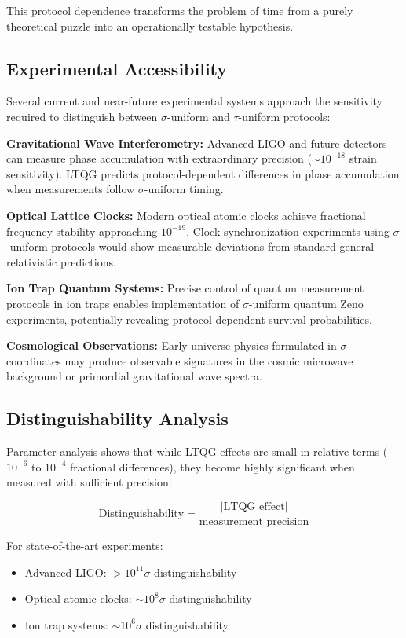 \documentclass[12pt,a4paper]{article}
\begin{document}
This protocol dependence transforms the problem of time from a purely theoretical puzzle into an operationally testable hypothesis.

\subsection{Experimental Accessibility}

Several current and near-future experimental systems approach the sensitivity required to distinguish between $\sigma$-uniform and $\tau$-uniform protocols:

\textbf{Gravitational Wave Interferometry:}
Advanced LIGO and future detectors can measure phase accumulation with extraordinary precision ($\sim 10^{-18}$ strain sensitivity). LTQG predicts protocol-dependent differences in phase accumulation when measurements follow $\sigma$-uniform timing.

\textbf{Optical Lattice Clocks:}
Modern optical atomic clocks achieve fractional frequency stability approaching $10^{-19}$. Clock synchronization experiments using $\sigma$-uniform protocols would show measurable deviations from standard general relativistic predictions.

\textbf{Ion Trap Quantum Systems:}
Precise control of quantum measurement protocols in ion traps enables implementation of $\sigma$-uniform quantum Zeno experiments, potentially revealing protocol-dependent survival probabilities.

\textbf{Cosmological Observations:}
Early universe physics formulated in $\sigma$-coordinates may produce observable signatures in the cosmic microwave background or primordial gravitational wave spectra.

\subsection{Distinguishability Analysis}

Parameter analysis shows that while LTQG effects are small in relative terms ($10^{-6}$ to $10^{-4}$ fractional differences), they become highly significant when measured with sufficient precision:

\begin{equation}
\text{Distinguishability} = \frac{|\text{LTQG effect}|}{\text{measurement precision}}
\end{equation}

For state-of-the-art experiments:
\begin{itemize}
\item Advanced LIGO: $>10^{11}\sigma$ distinguishability
\item Optical atomic clocks: $\sim 10^8\sigma$ distinguishability
\item Ion trap systems: $\sim 10^6\sigma$ distinguishability
\end{itemize}
\end{document}
